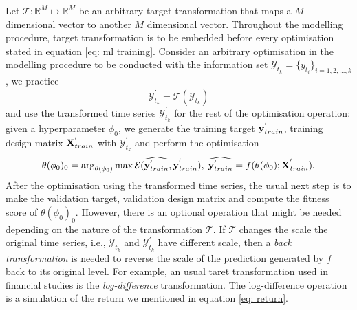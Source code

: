 Let $\mathcal{T}: \mathbb{R}^M \longmapsto \mathbb{R}^M$ be an arbitrary target transformation that maps a $M$ dimensional vector to another $M$ dimensional vector. Throughout the modelling procedure, target transformation is to be embedded before every optimisation stated in equation \ref{eq: ml training}. Consider an arbitrary optimisation in the modelling procedure to be conducted with the information set $\mathcal{Y}_{t_k} = \{ y_{t_i} \}_{i = 1, 2, \ldots, k}$, we practice
\begin{equation*}
    \mathcal{Y}^{'}_{t_k} = \mathcal{T}(\mathcal{Y}_{t_k})
\end{equation*}
and use the transformed time series $\mathcal{Y}^{'}_{t_k}$ for the rest of the optimisation operation: given a hyperparameter $\phi_0$, we generate the training target $\mathbf{y}^{'}_{train}$, training design matrix $\mathbf{X}^{'}_{train}$ with $\mathcal{Y}^{'}_{t_k}$ and perform the optimisation
\begin{equation*}
    \theta(\phi_0)_0 = \arg_{\theta(\phi_0)} \max \mathcal{E}(\widehat{\mathbf{y}^{'}_{train}}, \mathbf{y}^{'}_{train}), \; \widehat{\mathbf{y}^{'}_{train}} = f(\theta(\phi_0); \mathbf{X}^{'}_{train}).
\end{equation*}
After the optimisation using the transformed time series, the usual next step is to make the validation target, validation design matrix and compute the fitness score of $\theta(\phi_0)_0$. However, there is an optional operation that might be needed depending on the nature of the transformation $\mathcal{T}$. If $\mathcal{T}$ changes the scale the original time series, i.e., $\mathcal{Y}_{t_k}$ and $\mathcal{Y}^{'}_{t_k}$ have different scale, then a \textit{back transformation} is needed to reverse the scale of the prediction generated by $f$ back to its original level. For example, an usual taret transformation used in financial studies is the \textit{log-difference} transformation. The log-difference operation is a simulation of the return we mentioned in equation \ref{eq: return}.
